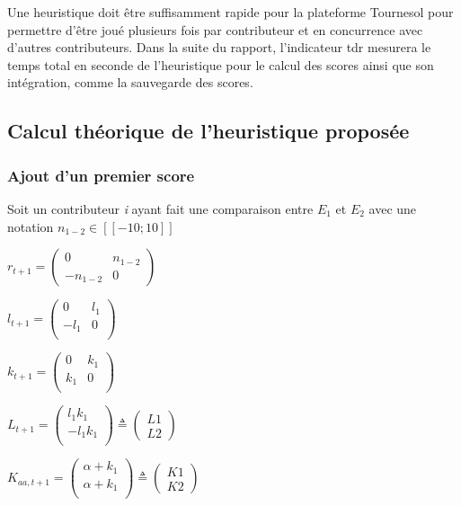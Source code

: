 Une heuristique doit être suffisamment rapide pour la plateforme Tournesol pour permettre d'être joué plusieurs fois par contributeur et en concurrence avec d'autres contributeurs.
Dans la suite du rapport, l'indicateur \gls{tdr} mesurera le temps total en seconde de l'heuristique pour le calcul des scores ainsi que son intégration, comme la sauvegarde des scores.

\subsection{Calcul théorique de l'heuristique proposée}\label{sub:theorie}

\subsubsection{Ajout d'un premier score}

Soit un contributeur \textit{i} ayant fait une comparaison entre $E_{1}$ et $E_{2}$ avec une notation $n_{1-2} \in [\![-10;10]\!]$

$r_{t+1}= \begin{pmatrix}
0 & n_{1-2} \\
-n_{1-2} & 0 
\end{pmatrix}$

$l_{t+1}= \begin{pmatrix}
0 & l_1 \\
-l_1 & 0 \\
\end{pmatrix}
$

$k_{t+1}= \begin{pmatrix}
0 & k_1 \\
k_1 & 0 \\
\end{pmatrix}
$


$L_{t+1}= \begin{pmatrix}
l_1 k_1\\
-l_1 k_1 \\
\end{pmatrix} \triangleq
\begin{pmatrix}
L1\\
L2
\end{pmatrix} 
$

$K_{aa,t+1}= \begin{pmatrix}
\alpha + k_1\\
\alpha +  k_1\\
\end{pmatrix} \triangleq
\begin{pmatrix}
K1\\
K2
\end{pmatrix} 
$

